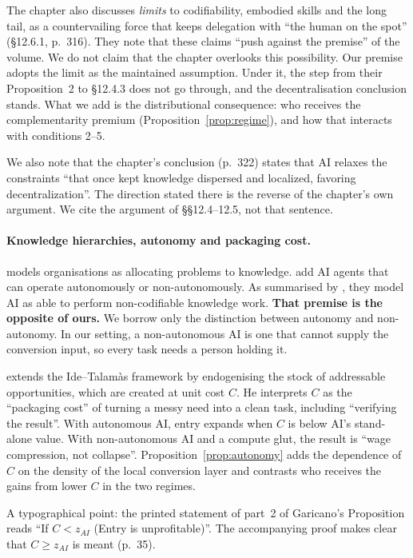 \documentclass[12pt]{article}
\theoremstyle{remark}
\begin{document}
The chapter also discusses \emph{limits} to codifiability, embodied skills and the long tail, as a countervailing force that keeps delegation with ``the human on the spot'' (\S12.6.1, p.~316). They note that these claims ``push against the premise'' of the volume. We do not claim that the chapter overlooks this possibility. Our premise adopts the limit as the maintained assumption. Under it, the step from their Proposition~2 to \S12.4.3 does not go through, and the decentralisation conclusion stands. What we add is the distributional consequence: who receives the complementarity premium (Proposition~\ref{prop:regime}), and how that interacts with conditions 2--5.

We also note that the chapter's conclusion (p.~322) states that AI relaxes the constraints ``that once kept knowledge dispersed and localized, favoring decentralization''. The direction stated there is the reverse of the chapter's own argument. We cite the argument of \S\S12.4--12.5, not that sentence.

\paragraph{Knowledge hierarchies, autonomy and packaging cost.} \citet{garicano2000hierarchies} models organisations as allocating problems to knowledge. \citet{ide2025knowledge} add AI agents that can operate autonomously or non-autonomously. As summarised by \citet[p.~179]{chatterji2026firms}, they model AI as able to perform non-codifiable knowledge work. \textbf{That premise is the opposite of ours.} We borrow only the distinction between autonomy and non-autonomy. In our setting, a non-autonomous AI is one that cannot supply the conversion input, so every task needs a person holding it.

\citet[pp.~33--35]{garicano2026comment} extends the Ide--Talamàs framework by endogenising the stock of addressable opportunities, which are created at unit cost $C$. He interprets $C$ as the ``packaging cost'' of turning a messy need into a clean task, including ``verifying the result''. With autonomous AI, entry expands when $C$ is below AI's stand-alone value. With non-autonomous AI and a compute glut, the result is ``wage compression, not collapse''. Proposition~\ref{prop:autonomy} adds the dependence of $C$ on the density of the local conversion layer and contrasts who receives the gains from lower $C$ in the two regimes.

A typographical point: the printed statement of part~2 of Garicano's Proposition reads ``If $C<z_{AI}$ (Entry is unprofitable)''. The accompanying proof makes clear that $C\ge z_{AI}$ is meant (p.~35).
\end{document}
